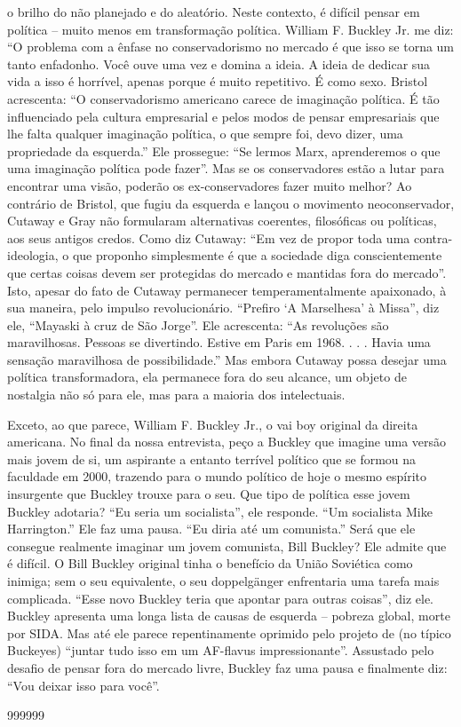o brilho do não planejado e do aleatório. Neste contexto, é difícil pensar em política – muito menos em transformação política. William F. Buckley Jr. me diz: “O problema com a ênfase no conservadorismo no mercado é que isso se torna um tanto enfadonho. Você ouve uma vez e domina a ideia. A ideia de dedicar sua vida a isso é horrível, apenas porque é muito repetitivo. É como sexo. Bristol acrescenta: “O conservadorismo americano carece de imaginação política. É tão influenciado pela cultura empresarial e pelos modos de pensar empresariais que lhe falta qualquer imaginação política, o que sempre foi, devo dizer, uma propriedade da esquerda.” Ele prossegue: “Se lermos Marx, aprenderemos o que uma imaginação política pode fazer”. Mas se os conservadores estão a lutar para encontrar uma visão, poderão os ex-conservadores fazer muito melhor? Ao contrário de Bristol, que fugiu da esquerda e lançou o movimento neoconservador, Cutaway e Gray não formularam alternativas coerentes, filosóficas ou políticas, aos seus antigos credos. Como diz Cutaway: “Em vez de propor toda uma contra-ideologia, o que proponho simplesmente é que a sociedade diga conscientemente que certas coisas devem ser protegidas do mercado e mantidas fora do mercado”. Isto, apesar do fato de Cutaway permanecer temperamentalmente apaixonado, à sua maneira, pelo impulso revolucionário. “Prefiro ‘A Marselhesa’ à Missa”, diz ele, “Mayaski à cruz de São Jorge”. Ele acrescenta: “As revoluções são maravilhosas. Pessoas se divertindo. Estive em Paris em 1968. . . . Havia uma sensação maravilhosa de possibilidade.” Mas embora Cutaway possa desejar uma política transformadora, ela permanece fora do seu alcance, um objeto de nostalgia não só para ele, mas para a maioria dos intelectuais.
 
\par
 
Exceto, ao que parece, William F. Buckley Jr., o vai boy original da direita americana. No final da nossa entrevista, peço a Buckley que imagine uma versão mais jovem de si, um aspirante a entanto terrível político que se formou na faculdade em 2000, trazendo para o mundo político de hoje o mesmo espírito insurgente que Buckley trouxe para o seu. Que tipo de política esse jovem Buckley adotaria? “Eu seria um socialista”, ele responde. “Um socialista Mike Harrington.” Ele faz uma pausa. “Eu diria até um comunista.” Será que ele consegue realmente imaginar um jovem comunista, Bill Buckley? Ele admite que é difícil. O Bill Buckley original tinha o benefício da União Soviética como inimiga; sem o seu equivalente, o seu doppelgänger enfrentaria uma tarefa mais complicada. “Esse novo Buckley teria que apontar para outras coisas”, diz ele. Buckley apresenta uma longa lista de causas de esquerda – pobreza global, morte por SIDA. Mas até ele parece repentinamente oprimido pelo projeto de (no típico Buckeyes) “juntar tudo isso em um AF-flavus impressionante”. Assustado pelo desafio de pensar fora do mercado livre, Buckley faz uma pausa e finalmente diz: “Vou deixar isso para você”.
 
\par
  
 
999999
